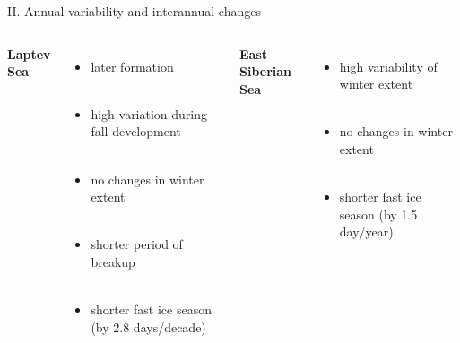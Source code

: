 \documentclass[8pt]{beamer}
\begin{document}
\setwatermark{\fontsize{125pt}{125pt}\selectfont{}}
\begin{frame}[fragile]{II. Annual variability and interannual changes}
\begin{columns}
	\centering
	\textbf{Laptev Sea}\\~\\
		\begin{itemize}
			\item later formation\\~\\
			\item high variation during fall development\\~\\
			\item no changes in winter extent\\~\\
			\item shorter period of breakup\\~\\
			\item shorter fast ice season (by 2.8 days/decade)\\~\\
			
		\end{itemize}
	
		\centering
	\textbf{East Siberian Sea}\\~\\
	\begin{itemize}
		\item high variability of winter extent\\~\\
		\item no changes in winter extent\\~\\
		\item shorter fast ice season (by 1.5 day/year) 
	\end{itemize}
\end{columns}
\end{frame}
\end{document}
